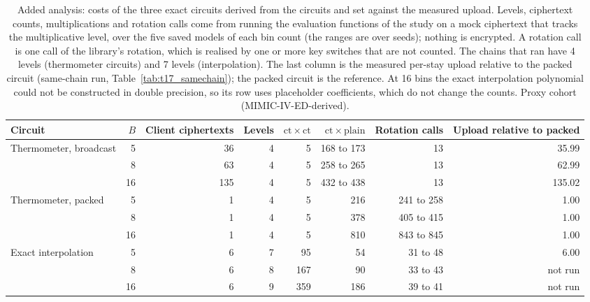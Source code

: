 \begin{table}[t]
\centering
\caption{Added analysis: costs of the three exact circuits derived from the circuits and set against the measured upload. Levels, ciphertext counts, multiplications and rotation calls come from running the evaluation functions of the study on a mock ciphertext that tracks the multiplicative level, over the five saved models of each bin count (the ranges are over seeds); nothing is encrypted. A rotation call is one call of the library's rotation, which is realised by one or more key switches that are not counted. The chains that ran have 4 levels (thermometer circuits) and 7 levels (interpolation). The last column is the measured per-stay upload relative to the packed circuit (same-chain run, Table~\ref{tab:t17_samechain}); the packed circuit is the reference. At 16 bins the exact interpolation polynomial could not be constructed in double precision, so its row uses placeholder coefficients, which do not change the counts. Proxy cohort (MIMIC-IV-ED-derived).}
\label{tab:t18_derived_costs}
\begin{tabular}{lrrrrrrr}
\toprule
Circuit & $B$ & Client ciphertexts & Levels & $\mathrm{ct}\times\mathrm{ct}$ & $\mathrm{ct}\times\mathrm{plain}$ & Rotation calls & Upload relative to packed \\
\midrule
Thermometer, broadcast & 5 & 36 & 4 & 5 & 168 to 173 & 13 & 35.99 \\
 & 8 & 63 & 4 & 5 & 258 to 265 & 13 & 62.99 \\
 & 16 & 135 & 4 & 5 & 432 to 438 & 13 & 135.02 \\
\midrule
Thermometer, packed & 5 & 1 & 4 & 5 & 216 & 241 to 258 & 1.00 \\
 & 8 & 1 & 4 & 5 & 378 & 405 to 415 & 1.00 \\
 & 16 & 1 & 4 & 5 & 810 & 843 to 845 & 1.00 \\
\midrule
Exact interpolation & 5 & 6 & 7 & 95 & 54 & 31 to 48 & 6.00 \\
 & 8 & 6 & 8 & 167 & 90 & 33 to 43 & not run \\
 & 16 & 6 & 9 & 359 & 186 & 39 to 41 & not run \\
\bottomrule
\end{tabular}
\end{table}
